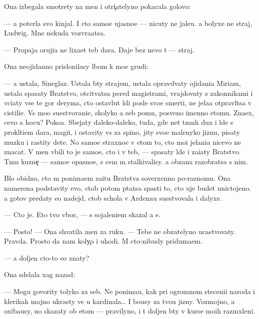 \documentclass[10pt]{book}
\begin{document}
Ona izbegala smotrety na men{\ia} i otri{\c}atelyno pokacala go\-lo\-vo{\y}:

— {\Y}a poter{\ia}la svo{\y} kinjal. I cto samo{\y}e ujasno{\y}e — nicuty ne jale{\y}u. {\Y}a bolyxe ne straj, Ludwig. Mne nekuda vozvra{\x}atsa.

— Propaja oruji{\y}a ne lixa{\y}et teb{\ia} dara. Daje bez nevo t{\yi} — straj.

Ona neojidanno prislonilasy lbom k mo{\y}e{\y} grudi:

— {\Y}a ustala, Sineglaz{\yi}{\y}. Ustala b{\yi}ty strajem, ustala opravd{\yi}vaty ojidani{\y}a Mi\-ri\-am, ustala spasaty Bratstvo, otcit{\yi}vatsa pered magistrami, vrajdovaty s zakonnikami i v{\yi}ci{\x}aty vse te gor{\yi} deryma, cto ostavl{\ia}{\y}ut l{\io}di posle svo{\y}e{\y} smerti, ne jela{\y}a otpravl{\ia}tsa v cistili{\x}e. Vs{\e} mo{\y}o su{\x}estvovani{\y}e, skoly\-ko {\y}a seb{\ia} pomn{\io}, posv{\ia}{\x}eno imenno etomu. Zna{\y}ex, cevo {\y}a hocu? Poko{\y}a. Sbejaty daleko-daleko, tuda, gde net t{\e}mn{\yi}h dux i l{\io}de{\y} s prokl{\ia}ti{\y}em dara, magi{\y}i, i ostavity vs{\e} za spino{\y}, jity svo{\y}e{\y} malenyko{\y} jizn{\y}u, pisaty muz{\yi}ku i rastity dete{\y}. No samo{\y}e straxno{\y}e v etom to, cto mo{\y}i jelani{\y}a nicevo ne znacat. V men{\ia} vbili to je samo{\y}e, cto i v teb{\ia}, — spasaty l{\io}de{\y} i za{\x}i{\x}aty Bratstvo. T{\e}mn{\yi}{\y} kuzne{\c} — samo{\y}e opasno{\y}e, s cem m{\yi} stalki\-va\-lisy. {\Y}a ob{\ia}zana razobratsa s nim.

B{\yi}lo obidno, cto m{\yi} ponima{\y}em za{\x}itu Bratstva soverxenno po-raznomu. Ona namerena podstavity {\y}evo, ctob{\yi} potom p{\yi}tatsa spasti to, cto uje budet unictojeno. {\Y}a gotov predaty {\y}e{\y}o nadejd{\yi}, ctob{\yi} schola v Ardenau su{\x}estvovala i dalyxe.

— Cto je. Eto tvo{\y} v{\yi}bor, — s sojaleni{\y}em skazal {\y}a {\y}e{\y}.

— Posto{\y}! — Ona shvatila men{\ia} za ruku. — Tebe ne ob{\ia}zatelyno ucastvovaty. Pravda. Prosto da{\y} nam koly{\c}o i uhodi. M{\yi} cto-nibudy priduma{\y}em.

— {\Y}a doljen cto-to {\y}e{\x}o znaty?

Ona sdelala xag nazad:

— Mogu govority tolyko za seb{\ia}. Ne ponima{\y}u, kak pri ogromnom steceni{\y}i na\-ro\-da i klerikah mojno ukrasty ve{\x} u kardinala… I bo{\y}usy za tvo{\y}u jizny. Voz\-moj\-no, {\y}a oxiba{\y}usy, no skazaty ob etom — pravilyno, i t{\yi} doljen b{\yi}ty v kurse mo{\y}ih razm{\yi}xleni{\y}.
\end{document}
